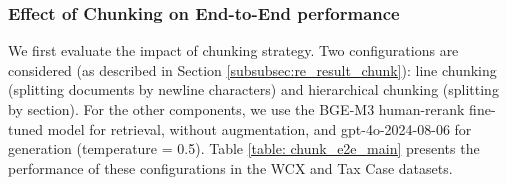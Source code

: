 \subsubsection{Effect of Chunking on End-to-End performance}
\label{subsubsec: chunk_e2e_result}
We first evaluate the impact of chunking strategy. Two configurations are considered (as described in Section \ref{subsubsec:re_result_chunk}): line chunking (splitting documents by newline characters) and hierarchical chunking (splitting by section). For the other components, we use the BGE-M3 human-rerank fine-tuned model for retrieval, without augmentation, and gpt-4o-2024-08-06 for generation (temperature = 0.5). Table \ref{table: chunk_e2e_main} presents the performance of these configurations in the WCX and Tax Case datasets.

\begin{table}[h!]
\centering
\caption{Effect of chunking configuration on E2E performance}
\renewcommand{\arraystretch}{1.5} %
\label{table: chunk_e2e_main}
\end{table}

